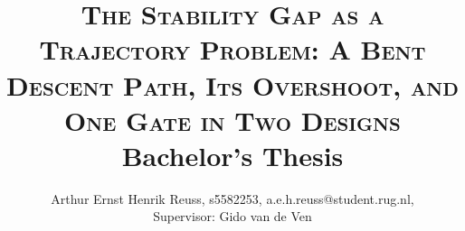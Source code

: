 \documentclass[10pt,a4paper,twocolumn]{article}
\title{\textbf{\textsc{The Stability Gap as a Trajectory Problem: A Bent Descent Path, Its Overshoot, and One Gate in Two Designs}} \\
    \vspace{1ex} 
    \normalsize Bachelor's Thesis\vspace{-2ex}
}
\author{
    \normalsize Arthur Ernst Henrik Reuss, s5582253, a.e.h.reuss@student.rug.nl, \\ 
    \normalsize Supervisor: Gido van de Ven
}
\date{\vspace{-5ex}}
\begin{document}
\onecolumn
\maketitle
\thispagestyle{firststyle}


\clearpage
\setcounter{tocdepth}{2} %
\tableofcontents

\twocolumn















\clearpage
\onecolumn

\begin{appendices}

\end{appendices}
\end{document}
